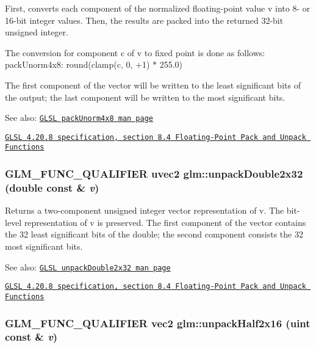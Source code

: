 First, converts each component of the normalized floating-point value v into 8- or 16-bit integer values. Then, the results are packed into the returned 32-bit unsigned integer.

The conversion for component c of v to fixed point is done as follows: packUnorm4x8: round(clamp(c, 0, +1) $\ast$ 255.0)

The first component of the vector will be written to the least significant bits of the output; the last component will be written to the most significant bits.

\begin{Desc}
\item[See also:]\href{http://www.opengl.org/sdk/docs/manglsl/xhtml/packUnorm4x8.xml}{\tt GLSL packUnorm4x8 man page} 

\href{http://www.opengl.org/registry/doc/GLSLangSpec.4.20.8.pdf}{\tt GLSL 4.20.8 specification, section 8.4 Floating-Point Pack and Unpack Functions} \end{Desc}
\hypertarget{group__core__func__packing_g7e8cf88c278c18969c99af83bceed024}{
\subsubsection[unpackDouble2x32]{\setlength{\rightskip}{0pt plus 5cm}GLM\_\-FUNC\_\-QUALIFIER uvec2 glm::unpackDouble2x32 (double const \& {\em v})}}
\label{group__core__func__packing_g7e8cf88c278c18969c99af83bceed024}


Returns a two-component unsigned integer vector representation of v. The bit-level representation of v is preserved. The first component of the vector contains the 32 least significant bits of the double; the second component consists the 32 most significant bits.

\begin{Desc}
\item[See also:]\href{http://www.opengl.org/sdk/docs/manglsl/xhtml/unpackDouble2x32.xml}{\tt GLSL unpackDouble2x32 man page} 

\href{http://www.opengl.org/registry/doc/GLSLangSpec.4.20.8.pdf}{\tt GLSL 4.20.8 specification, section 8.4 Floating-Point Pack and Unpack Functions} \end{Desc}
\hypertarget{group__core__func__packing_g4051804cc2c930ba4ca73382b79edf1d}{
\subsubsection[unpackHalf2x16]{\setlength{\rightskip}{0pt plus 5cm}GLM\_\-FUNC\_\-QUALIFIER vec2 glm::unpackHalf2x16 (uint const \& {\em v})}}
\label{group__core__func__packing_g4051804cc2c930ba4ca73382b79edf1d}


